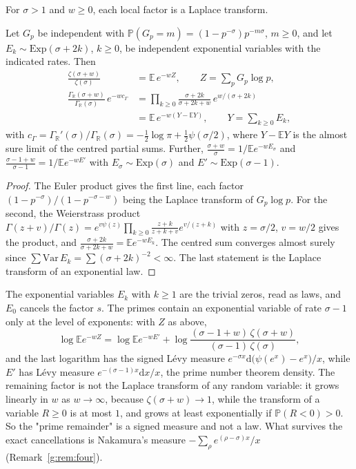 For $\sigma>1$ and $w\ge0$, each local factor is a Laplace transform.

\begin{proposition}\label{g:prop:rv}
Let $G_p$ be independent with $\mathbb P(G_p=m)=(1-p^{-\sigma})p^{-m\sigma}$, $m\ge0$, and let $E_k\sim\mathrm{Exp}(\sigma+2k)$, $k\ge0$, be independent exponential variables with the indicated rates. Then
\begin{align*}
\frac{\zeta(\sigma+w)}{\zeta(\sigma)}&=\mathbb E\,e^{-wZ},\qquad Z=\sum_pG_p\log p,\\
\frac{\Gamma_{\mathbb R}(\sigma+w)}{\Gamma_{\mathbb R}(\sigma)}\,e^{-wc_\Gamma}&=\prod_{k\ge0}\frac{\sigma+2k}{\sigma+2k+w}\,e^{w/(\sigma+2k)}\\
&=\mathbb E\,e^{-w(Y-\mathbb EY)},\qquad Y=\sum_{k\ge0}E_k,
\end{align*}
with $c_\Gamma=\Gamma_{\mathbb R}'(\sigma)/\Gamma_{\mathbb R}(\sigma)=-\frac12\log\pi+\frac12\psi(\sigma/2)$, where $Y-\mathbb EY$ is the almost sure limit of the centred partial sums. Further, $\frac{\sigma+w}{\sigma}=1/\mathbb Ee^{-wE_\sigma}$ and $\frac{\sigma-1+w}{\sigma-1}=1/\mathbb Ee^{-wE'}$ with $E_\sigma\sim\mathrm{Exp}(\sigma)$ and $E'\sim\mathrm{Exp}(\sigma-1)$.
\end{proposition}

\begin{proof}
The Euler product gives the first line, each factor $(1-p^{-\sigma})/(1-p^{-\sigma-w})$ being the Laplace transform of $G_p\log p$. For the second, the Weierstrass product $\Gamma(z+v)/\Gamma(z)=e^{v\psi(z)}\prod_{k\ge0}\frac{z+k}{z+k+v}e^{v/(z+k)}$ with $z=\sigma/2$, $v=w/2$ gives the product, and $\frac{\sigma+2k}{\sigma+2k+w}=\mathbb Ee^{-wE_k}$. The centred sum converges almost surely since $\sum\mathrm{Var}\,E_k=\sum(\sigma+2k)^{-2}<\infty$. The last statement is the Laplace transform of an exponential law.
\end{proof}

The exponential variables $E_k$ with $k\ge1$ are the trivial zeros, read as laws, and $E_0$ cancels the factor $s$. The primes contain an exponential variable of rate $\sigma-1$ only at the level of exponents: with $Z$ as above,
\[
\log\mathbb Ee^{-wZ}=\log\mathbb Ee^{-wE'}+\log\frac{(\sigma-1+w)\,\zeta(\sigma+w)}{(\sigma-1)\,\zeta(\sigma)},
\]
and the last logarithm has the signed L\'evy measure $e^{-\sigma x}\mathrm d\big(\psi(e^x)-e^x\big)/x$, while $E'$ has L\'evy measure $e^{-(\sigma-1)x}\mathrm dx/x$, the prime number theorem density. The remaining factor is not the Laplace transform of any random variable: it grows linearly in $w$ as $w\to\infty$, because $\zeta(\sigma+w)\to1$, while the transform of a variable $R\ge0$ is at most $1$, and grows at least exponentially if $\mathbb P(R<0)>0$. So the "prime remainder" is a signed measure and not a law. What survives the exact cancellations is Nakamura's measure $-\sum_\rho e^{(\rho-\sigma)x}/x$ (Remark~\ref{g:rem:four}).

